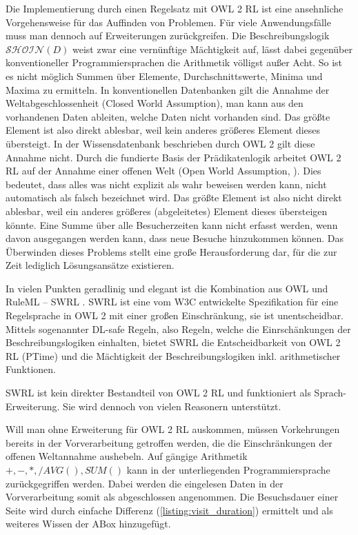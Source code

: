 \documentclass[runningheads,a4paper]{llncs}
\begin{document}
Die Implementierung durch einen Regelsatz mit OWL 2 RL \cite{owl2rl} ist eine ansehnliche Vorgehensweise für das Auffinden von Problemen. 
Für viele Anwendungsfälle muss man dennoch auf Erweiterungen zurückgreifen. 
Die Beschreibungslogik \(\mathcal{SHOIN}(D)\) weist zwar eine vernünftige Mächtigkeit auf, lässt dabei gegenüber konventioneller Programmiersprachen die Arithmetik völligst außer Acht. 
So ist es nicht möglich Summen über Elemente, Durchschnittswerte, Minima und Maxima zu ermitteln. 
In konventionellen Datenbanken gilt die Annahme der Weltabgeschlossenheit (Closed World Assumption), man kann aus den vorhandenen Daten ableiten, welche Daten nicht vorhanden sind. 
Das größte Element ist also direkt ablesbar, weil kein anderes größeres Element dieses übersteigt. 
In der Wissensdatenbank beschrieben durch OWL 2 gilt diese Annahme nicht. 
Durch die fundierte Basis der Prädikatenlogik arbeitet OWL 2 RL auf der Annahme einer offenen Welt (Open World Assumption, \cite[p. 194]{foundations}). 
Dies bedeutet, dass alles was nicht explizit als wahr beweisen werden kann, nicht automatisch als falsch bezeichnet wird. 
Das größte Element ist also nicht direkt ablesbar, weil ein anderes größeres (abgeleitetes) Element dieses übersteigen könnte. 
Eine Summe über alle Besucherzeiten kann nicht erfasst werden, wenn davon ausgegangen werden kann, dass neue Besuche hinzukommen können.
Das Überwinden dieses Problems stellt eine große Herausforderung dar, für die zur Zeit lediglich Lösungsansätze existieren. 

In vielen Punkten geradlinig und elegant ist die Kombination aus OWL und RuleML -- SWRL \cite{swrl}. 
SWRL ist eine vom W3C entwickelte Spezifikation für eine Regelsprache in OWL 2 \cite{owl2} mit einer großen Einschränkung, sie ist unentscheidbar. 
Mittels sogenannter DL-safe Regeln, also Regeln, welche die Einrschänkungen der Beschreibungslogiken einhalten, bietet SWRL die Entscheidbarkeit von OWL 2 RL (PTime) und die Mächtigkeit der Beschreibungslogiken inkl. arithmetischer Funktionen. 

SWRL ist kein direkter Bestandteil von OWL 2 RL und funktioniert als Sprach-Erweiterung. 
Sie wird dennoch von vielen Reasonern unterstützt.

Will man ohne Erweiterung für OWL 2 RL auskommen, müssen Vorkehrungen bereits in der Vorverarbeitung getroffen werden, die die Einschränkungen der offenen Weltannahme aushebeln. 
Auf gängige Arithmetik \(+, -, *, / AVG(), SUM() \) kann in der unterliegenden Programmiersprache zurückgegriffen werden.
Dabei werden die eingelesen Daten in der Vorverarbeitung somit als abgeschlossen angenommen.
Die Besuchsdauer einer Seite wird durch einfache Differenz (\ref{listing:visit_duration}) ermittelt und als weiteres Wissen der ABox hinzugefügt.
\end{document}
